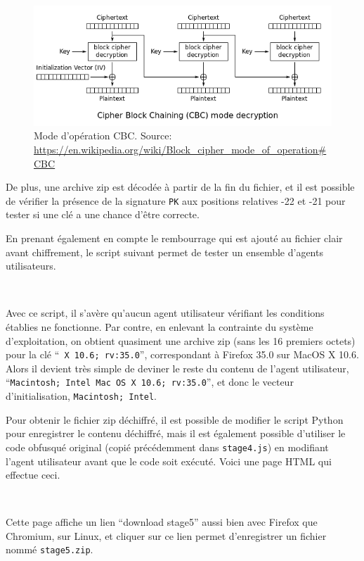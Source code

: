 \documentclass[a4paper,10pt]{article}
\newcommand{\pyinput}[1]{%
    \noindent{\color[rgb]{0.5, 0.5, 0.5}{\rule{\textwidth}{0.4pt}}}
     \\
    \noindent{\color[rgb]{0.5, 0.5, 0.5}{\rule{\textwidth}{0.4pt}}}
}
\begin{document}
\begin{figure}[ht]
  \centering
  \includegraphics[width=14cm]{stage4/CBC-decryption.png}
  \caption{Mode d'opération CBC. Source: \url{https://en.wikipedia.org/wiki/Block_cipher_mode_of_operation\#CBC}}
  \label{fig-cbc-wikipedia}
\end{figure}

De plus, une archive zip est décodée à partir de la fin du fichier, et il est possible de vérifier la présence de la signature \texttt{PK} aux positions relatives -22 et -21 pour tester si une clé a une chance d'être correcte.

En prenant également en compte le rembourrage qui est ajouté au fichier clair avant chiffrement, le script suivant permet de tester un ensemble d'agents utilisateurs.

\pyinput{stage4/pseudo-brute.py.inc.tex}

Avec ce script, il s'avère qu'aucun agent utilisateur vérifiant les conditions établies ne fonctionne.
Par contre, en enlevant la contrainte du système d'exploitation, on obtient quasiment une archive zip (sans les 16 premiers octets) pour la clé ``\texttt{ X 10.6; rv:35.0}'', correspondant à Firefox 35.0 sur MacOS X 10.6.
Alors il devient très simple de deviner le reste du contenu de l'agent utilisateur, ``\texttt{Macintosh; Intel Mac OS X 10.6; rv:35.0}'', et donc le vecteur d'initialisation, \texttt{Macintosh; Intel}.

Pour obtenir le fichier zip déchiffré, il est possible de modifier le script Python pour enregistrer le contenu déchiffré, mais il est également possible d'utiliser le code obfusqué original (copié précédemment dans \texttt{stage4.js}) en modifiant l'agent utilisateur avant que le code soit exécuté.
Voici une page HTML qui effectue ceci.

\pyinput{stage4/show_downloadlink.html.inc.tex}

Cette page affiche un lien ``download stage5'' aussi bien avec Firefox que Chromium, sur Linux, et cliquer sur ce lien permet d'enregistrer un fichier nommé \texttt{stage5.zip}.
\end{document}

